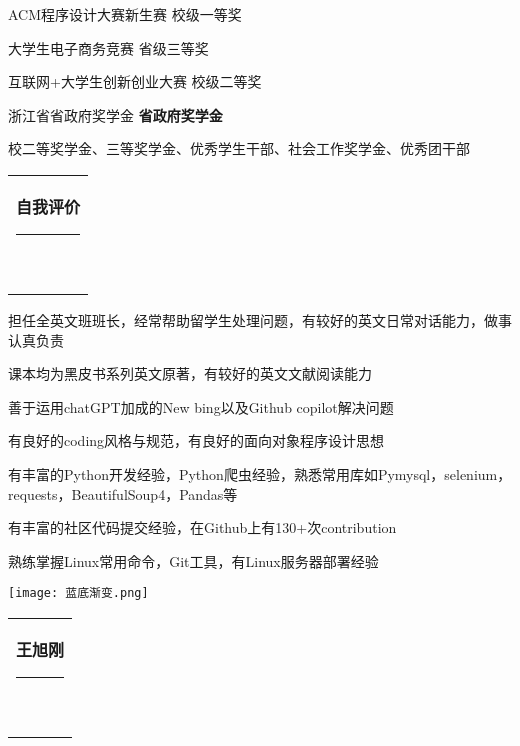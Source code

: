 \documentclass[10pt,A4]{article}
\renewcommand{\CJKglue}{\hskip 1.5pt}
\newcommand{\mpwidth}{\linewidth-\fboxsep-\fboxsep} %
\newcommand{\cvtext}[1] {
	\begin{tabular*}{1\mpwidth}{p{0.98\mpwidth}}
		\parbox{1\mpwidth}{#1}
	\end{tabular*}
}
\newcommand{\mysection}[1] {
	
    \vspace{12pt}

	\cvtext{
        \begingroup
        \renewcommand{\CJKglue}{\hskip 2.5pt}
		\textbf{\LARGE{\textcolor{darkcol}{\uppercase{#1}}}}\\[-4pt]
		\textcolor{maincol}{ \rule{0.1\textwidth}{2pt} } \\[-6pt]
        \endgroup
        }
}
\newcommand{\cvlist}[1] {


	\begin{itemize}
        {#1}
    \end{itemize}

    \vspace{3pt}

    }
\begin{document}
\begin{paracol}{2}
\begin{leftcolumn}
{        \item ACM程序设计大赛新生赛  { \hfill 校级一等奖 }

        \item 大学生电子商务竞赛  { \hfill 省级三等奖 }

        \item 互联网+大学生创新创业大赛  { \hfill 校级二等奖 }

        \item 浙江省省政府奖学金  { \hfill \textbf{省政府奖学金} }

        \item 校二等奖学金、三等奖学金、优秀学生干部、社会工作奖学金、优秀团干部

        }
        \vspace{-20pt}

        \vfill\null

        \mysection{自我评价}

        \cvlist{
            \item 担任全英文班班长，经常帮助留学生处理问题，有较好的英文日常对话能力，做事认真负责
            \item 课本均为黑皮书系列英文原著，有较好的英文文献阅读能力
            \item 善于运用chatGPT加成的New bing以及Github copilot解决问题
            \item 有良好的coding风格与规范，有良好的面向对象程序设计思想
            \item 有丰富的Python开发经验，Python爬虫经验，熟悉常用库如Pymysql，selenium，requests，BeautifulSoup4，Pandas等
            \item 有丰富的社区代码提交经验，在Github上有130+次contribution
            \item 熟练掌握Linux常用命令，Git工具，有Linux服务器部署经验
        }

        \vfill\null

    \end{leftcolumn}

    \begin{rightcolumn}

        {\begin{center}\texttt{[image: 蓝底渐变.png]}\end{center}}

        \vfill\null

        \mysection{王旭刚}


\end{rightcolumn}
\end{paracol}
\end{document}
